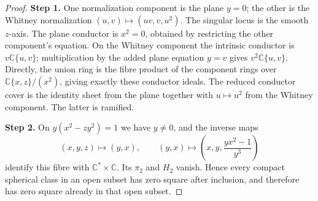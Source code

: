 \begin{proof}
\noindent\textbf{Step 1.} One normalization component is the plane $y=0$; the other is
the Whitney normalization $(u,v)\mapsto(uv,v,u^2)$.
The singular locus is the smooth $z$-axis. The plane conductor
is $x^2=0$, obtained by restricting the other component's
equation. On the Whitney component the intrinsic conductor
is $v\mathbb C\{u,v\}$; multiplication by the added plane
equation $y=v$ gives $v^2\mathbb C\{u,v\}$. Directly, the
union ring is the fibre product of the component rings over
$\mathbb C\{x,z\}/(x^2)$, giving exactly these conductor ideals.
The reduced conductor cover is the identity sheet from the
plane together with $u\mapsto u^2$ from the Whitney component.
The latter is ramified.

\noindent\textbf{Step 2.} On $y(x^2-zy^2)=1$ we have $y\ne0$, and the inverse maps
\[
 (x,y,z)\longmapsto(y,x),\qquad
 (y,x)\longmapsto\left(x,y,\frac{yx^2-1}{y^3}\right)
\]
identify this fibre with $\mathbb C^*\times\mathbb C$.
Its $\pi_2$ and $H_2$ vanish. Hence every compact spherical
class in an open subset has zero square after inclusion,
and therefore has zero square already in that open subset.
\end{proof}

